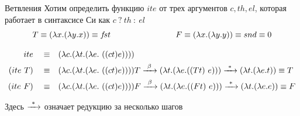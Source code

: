 \begin{frame}{Ветвления}
\def\ite{\lam{c}{\lam{t}{\lam{e}{\ \app{\app{c}{t}}{e}}}}}
Хотим определить функцию $ite$ от трех аргументов $c, th, el$, которая работает в синтаксисе Си как $c\ ?\ th\ :\ el$
\[
T\equiv(\lambda x . (\lambda y . x)) \equiv f\!st \qquad \qquad \qquad \qquad
F\equiv (\lambda x . (\lambda y . y))\equiv snd \equiv 0
\]

\begin{align*}
  ite \quad\equiv &\quad \lam{c}{\lam{t}{\lam{e}{\ \app{\app{c}{t}}{e}}}}\\
  (ite\ T) \quad\equiv &\quad \ite T \arrbeta \lam{t}{\lam{e}{ (\app{T}{t}\ e)}} \arrmany \lam{t}{\lam{e}{t}}\equiv T\\
  (ite\ F) \quad\equiv &\quad \ite F \arrbeta \lam{t}{\lam{e}{ (\app{F}{t}\ e)}} \arrmany \lam{t}{\lam{e}{e}}\equiv F
\end{align*}

Здесь $\xrightarrow{\ *\ }$ означает редукцию за несколько шагов
\end{frame}




